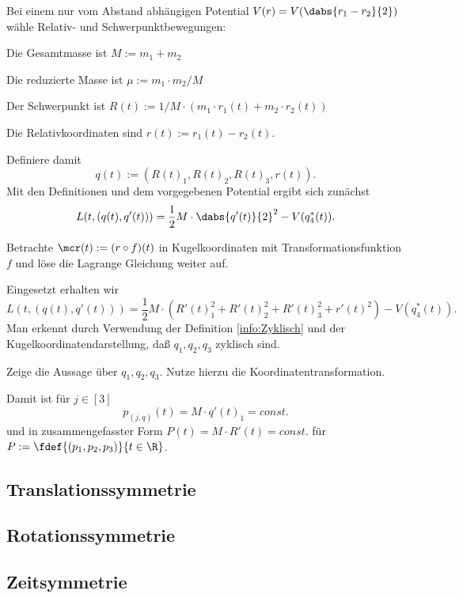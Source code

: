 \documentclass[../WiSe22ANA3.tex]{subfiles}
\begin{document}
			\begin{Beispiel}[Zweikörperproblem]
				Bei einem nur vom Abstand abhängigen Potential $V(r)=V(\dabs{r_1-r_2}{2})$ wähle Relativ- und Schwerpunktbewegungen:
				\begin{clist}
					\item Die Gesamtmasse ist $M:=m_1+m_2$
					\item Die reduzierte Masse ist $\mu:=m_1\cdot m_2/M$
					\item Der Schwerpunkt ist $R(t):=1/M\cdot (m_1\cdot r_1(t)+m_2\cdot r_2(t))$
					\item Die Relativkoordinaten sind $r(t):=r_1(t)-r_2(t)$.
				\end{clist}
				Definiere damit 
				$$q(t):=(R(t)_1,R(t)_2,R(t)_3,r(t)).$$
				Mit den Definitionen und dem vorgegebenen Potential ergibt sich zunächst
				$$L(t,(q(t),q'(t)))=\frac{1}{2}M\cdot\dabs{q'(t)}{2}^2-V(q_4^*(t)).$$
				\begin{Aufgabe}
					\nr Betrachte $\mcr(t):=(r\circ f)(t)$ in Kugelkoordinaten mit Transformationsfunktion $f$ und löse die Lagrange Gleichung weiter auf. 
				\end{Aufgabe}
				Eingesetzt erhalten wir 
				$$L(t,(q(t),q'(t)))=\frac{1}{2}M\cdot(R'(t)_1^2+R'(t)_2^2+R'(t)_3^2+r'(t)^2)-V(q_4^*(t)).$$
				Man erkennt durch Verwendung der Definition \eqref{info:Zyklisch} und der Kugelkoordinatendarstellung, daß $q_1,q_2,q_3$ zyklisch sind.
				\begin{Aufgabe}
					\nr Zeige die Aussage über $q_1,q_2,q_3$. Nutze hierzu die Koordinatentransformation. 
				\end{Aufgabe}
				Damit ist für $j\in[3]$ 
				$$p_{(j,q)}(t)=M\cdot q'(t)_1=const.$$
				und in zusammengefasster Form $P(t)=M\cdot R'(t)=const.$ für $P:=\fdef{(p_1,p_2,p_3)}{t\in\R}$. 
			\end{Beispiel}
			
			\subsection{Translationssymmetrie}
				
			\subsection{Rotationssymmetrie}
				
			\subsection{Zeitsymmetrie}
				
\end{document}
